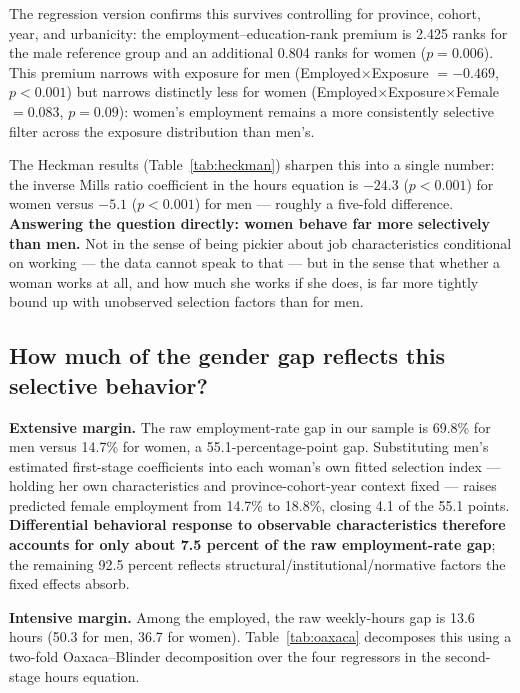 \documentclass[11pt]{article}
\begin{document}
The regression version confirms this survives controlling for province, cohort, year, and urbanicity: the employment--education-rank premium is 2.425 ranks for the male reference group and an additional 0.804 ranks for women ($p=0.006$). This premium narrows with exposure for men (Employed$\times$Exposure $=-0.469$, $p<0.001$) but narrows distinctly less for women (Employed$\times$Exposure$\times$Female $=0.083$, $p=0.09$): women's employment remains a more consistently selective filter across the exposure distribution than men's.

The Heckman results (Table~\ref{tab:heckman}) sharpen this into a single number: the inverse Mills ratio coefficient in the hours equation is $-24.3$ ($p<0.001$) for women versus $-5.1$ ($p<0.001$) for men --- roughly a five-fold difference. \textbf{Answering the question directly: women behave far more selectively than men.} Not in the sense of being pickier about job characteristics conditional on working --- the data cannot speak to that --- but in the sense that whether a woman works at all, and how much she works if she does, is far more tightly bound up with unobserved selection factors than for men.

\subsection{How much of the gender gap reflects this selective behavior?}

\textbf{Extensive margin.} The raw employment-rate gap in our sample is 69.8\% for men versus 14.7\% for women, a 55.1-percentage-point gap. Substituting men's estimated first-stage coefficients into each woman's own fitted selection index --- holding her own characteristics and province-cohort-year context fixed --- raises predicted female employment from 14.7\% to 18.8\%, closing 4.1 of the 55.1 points. \textbf{Differential behavioral response to observable characteristics therefore accounts for only about 7.5 percent of the raw employment-rate gap}; the remaining 92.5 percent reflects structural/institutional/normative factors the fixed effects absorb.

\textbf{Intensive margin.} Among the employed, the raw weekly-hours gap is 13.6 hours (50.3 for men, 36.7 for women). Table~\ref{tab:oaxaca} decomposes this using a two-fold Oaxaca--Blinder decomposition over the four regressors in the second-stage hours equation.
\end{document}
